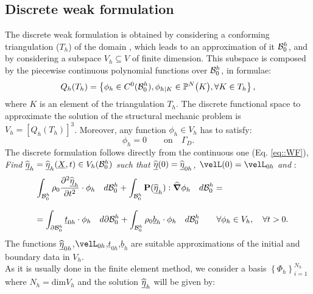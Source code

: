 \subsection{Discrete weak formulation}
\label{sct-DiscreteWF} The discrete weak formulation is obtained by
considering a conforming triangulation ($T_h$) of the domain \RefCon,
which leads to an approximation of it $\mathcal{B}_0^h$, and by considering
a subspace $V_h\subseteq V$ of finite dimension. This subspace is
composed by the piecewise continuous polynomial functions over
$\mathcal{B}_0^h$, in formulae:
\begin{equation} Q_h(T_h)=\left\{\phi_h \in C^0(\mathcal{B}_0^h),
    \phi_{h|K} \in \mathbb{P}^N\big(K\big), \forall K \in T_h\right\},
  \label{eq::SpaceDiscrete}
\end{equation} where $K$ is an element of the triangulation $T_h$. The
discrete functional space to approximate the solution of the
structural mechanic problem is
$V_h=\left[Q_h(T_h)\right]^3$. Moreover, any function $\phi_h\in V_h$
has to satisfy:
\begin{displaymath} \phi_h=0 \qquad \text{on}\quad\Gamma_D.
\end{displaymath} The discrete formulation follows directly from the
continuous one (Eq. \eqref{eq::WF}),\\ \textit{Find
  $\widehat{\underline{\eta}}_h=\widehat{\underline{\eta}}_h(\underline{X},t)\in V_h(\mathcal{B}_0^h)$ such that
  $\widehat{\underline{\eta}}(0)=\widehat{\underline{\eta}}_{0h}$, $\velL(0)=\velL_{0h}$ and} :
\begin{equation}
  \begin{array}{lll} & \displaystyle
    \int_{\mathcal{B}_0^h}\rho_0\frac{\partial^2 \widehat{\underline{\eta}}_h}{\partial
      t^2}\cdot\phi_h\quad d\mathcal{B}_0^h +
    \int_{\mathcal{B}_0^h}\textbf{P}(\widehat{\underline{\eta}}_h):\widehat{\boldsymbol{\nabla}}\phi_h\quad d\mathcal{B}_0^h = \\
    \\ & \displaystyle = \int_{\partial
      \mathcal{B}_0^h}\underline{t}_{0h}\cdot\phi_h\quad d\partial\mathcal{B}_0^h +
    \int_{\mathcal{B}_0^h}\rho_0 \underline{b}_h\cdot\phi_h\quad d\mathcal{B}_0^h
    \qquad \forall \phi_h\in V_h, \quad \forall t>0.
  \end{array}
  \label{eq::DWF}
\end{equation} The functions
$\widehat{\underline{\eta}}_{0h}$,$\velL_{0h}$,$\underline{t}_{0h}$,$\underline{b}_h$ are
suitable approximations of the initial and boundary data in $V_h$.\\
As it is usually done in the finite element method, we consider a
basis $\left\{\Phi_h\right\}_{i=1}^{N_h}$ where $N_h=\text{dim}V_h$
and the solution $\widehat{\underline{\eta}}_h$ will be given by:
